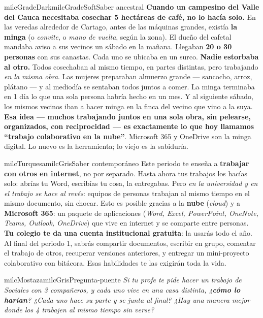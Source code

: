 \documentclass[11pt,letterpaper]{article}
\begin{document}
\begin{softbox}{milcGradeDark}{milcGradeSoft}{Saber ancestral}
\textbf{Cuando un campesino del Valle del Cauca necesitaba cosechar 5 hectáreas de café, no lo hacía solo.} En las veredas alrededor de Cartago, antes de las máquinas grandes, existía \textbf{la minga} (o \emph{convite}, o \emph{mano de vuelta}, según la zona). El dueño del cafetal mandaba aviso a sus vecinos un sábado en la mañana. Llegaban \textbf{20 o 30 personas} con sus canastas. Cada uno se ubicaba en un surco. \textbf{Nadie estorbaba al otro.} Todos cosechaban al mismo tiempo, en partes distintas, pero trabajando \emph{en la misma obra}. Las mujeres preparaban almuerzo grande --- sancocho, arroz, plátano --- y al mediodía se sentaban todos juntos a comer. La minga terminaba en 1 día lo que una sola persona habría hecho en un mes. Y al siguiente sábado, los mismos vecinos iban a hacer minga en la finca del vecino que vino a la suya. \textbf{Esa idea --- muchos trabajando juntos en una sola obra, sin pelearse, organizados, con reciprocidad --- es exactamente lo que hoy llamamos ``trabajo colaborativo en la nube''}. Microsoft 365 y OneDrive son la minga digital. Lo nuevo es la herramienta; lo viejo es la sabiduría.
\end{softbox}

\begin{softbox}{milcTurquesa}{milcGris}{Saber contemporáneo}
Este periodo te enseña a \textbf{trabajar con otros en internet}, no por separado. Hasta ahora tus trabajos los hacías solo: abrías tu Word, escribías tu cosa, la entregabas. Pero \emph{en la universidad y en el trabajo se hace al revés}: equipos de personas trabajan al mismo tiempo en el mismo documento, sin chocar. Esto es posible gracias a la \textbf{nube} (\emph{cloud}) y a \textbf{Microsoft 365}: un paquete de aplicaciones (\emph{Word, Excel, PowerPoint, OneNote, Teams, Outlook, OneDrive}) que vive en internet y se comparte entre personas. \textbf{Tu colegio te da una cuenta institucional gratuita}: la usarás todo el año. Al final del periodo 1, sabrás compartir documentos, escribir en grupo, comentar el trabajo de otros, recuperar versiones anteriores, y entregar un mini-proyecto colaborativo con bitácora. Esas habilidades te las exigirán toda la vida.
\end{softbox}

\begin{softbox}{milcMostaza}{milcGris}{Pregunta-puente}
\textit{Si tu profe te pide hacer un trabajo de Sociales con 3 compañeros, y cada uno vive en una casa distinta, ¿\textbf{cómo lo harían}? ¿Cada uno hace su parte y se junta al final? ¿Hay una manera mejor donde los 4 trabajen al mismo tiempo sin verse?}
\end{softbox}
\end{document}
